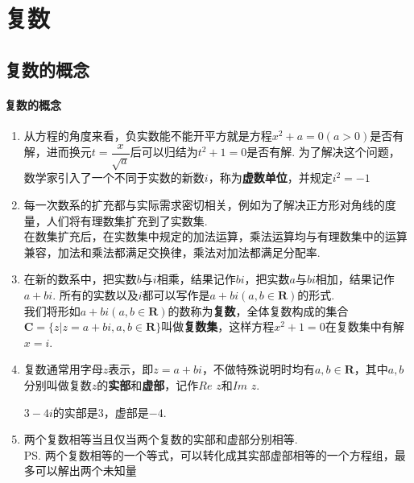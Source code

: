 \chapter*{复数}
\section*{复数的概念}
\subsubsection*{复数的概念}
\begin{enumerate}
    \item 从方程的角度来看，负实数能不能开平方就是方程$x^2+a = 0(a > 0)$是否有解，进而换元$t = \dfrac{x}{\sqrt{a}}$后可以归结为$t^2+1 = 0$是否有解. 为了解决这个问题，数学家引入了一个不同于实数的新数$i$，称为\textbf{虚数单位}，并规定$i^2 = -1$
    \item 每一次数系的扩充都与实际需求密切相关，例如为了解决正方形对角线的度量，人们将有理数集扩充到了实数集. \\
    在数集扩充后，在实数集中规定的加法运算，乘法运算均与有理数集中的运算兼容，加法和乘法都满足交换律，乘法对加法都满足分配率.
    \item 在新的数系中，把实数$b$与$i$相乘，结果记作$bi$，把实数$a$与$bi$相加，结果记作$a+bi$. 所有的实数以及$i$都可以写作是$a+bi(a, b \in \mathbf{R})$的形式. \\
    我们将形如$a+bi(a, b \in \mathbf{R})$的数称为\textbf{复数}，全体复数构成的集合$\mathbf{C} = \{z| z = a+bi, a,b \in \mathbf{R}\}$叫做\textbf{复数集}，这样方程$x^2+1 = 0$在复数集中有解$x = i$.
    \item 复数通常用字母$z$表示，即$z = a + bi$，不做特殊说明时均有$a, b \in \mathbf{R}$，其中$a, b$分别叫做复数$z$的\textbf{实部}和\textbf{虚部}，记作$Re$ $z$和$Im$ $z$. 
    \begin{example}
        $3-4i$的实部是3，虚部是$-4$.
    \end{example}
    \item 两个复数相等当且仅当两个复数的实部和虚部分别相等. \\
    \ps 两个复数相等的一个等式，可以转化成其实部虚部相等的一个方程组，最多可以解出两个未知量
\end{enumerate}

